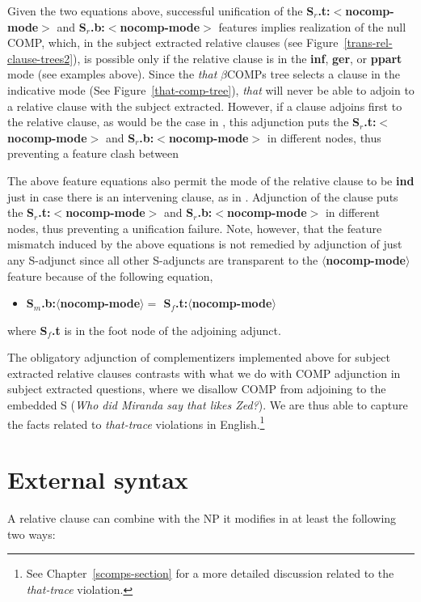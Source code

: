 Given the two equations above, successful unification of the {\bf
S$_r$.t:$<$nocomp-mode$>$} and {\bf S$_r$.b:$<$nocomp-mode$>$} features
implies realization of the null COMP, which, in the subject extracted
relative clauses (see Figure~\ref{trans-rel-clause-trees2}), is possible
only if the relative clause is in the {\bf inf}, {\bf ger}, or {\bf ppart}
mode (see examples above). Since the {\it that} $\beta$COMPs tree selects a
clause in the indicative mode (See Figure~\ref{that-comp-tree}), {\it that}
will never be able to adjoin to a relative clause with the subject
extracted. However, if a clause adjoins first to the relative clause, as
would be the case in , this adjunction puts the {\bf
S$_r$.t:$<$nocomp-mode$>$} and {\bf S$_r$.b:$<$nocomp-mode$>$} in different
nodes, thus preventing a feature clash between

The above feature equations also permit the mode of the relative clause to
be {\bf ind} just in case there is an intervening clause, as in
. Adjunction of the clause puts the {\bf S$_r$.t:$<$nocomp-mode$>$}
and {\bf S$_r$.b:$<$nocomp-mode$>$} in different nodes, thus preventing a
unification failure. Note, however, that the feature mismatch induced by
the above equations is not remedied by adjunction of just any S-adjunct
since all other S-adjuncts are transparent to the {\bf
$\langle$nocomp-mode$\rangle$} feature because of the following equation,

\begin{itemize}
\item {\bf S$_{m}$.b:$\langle$nocomp-mode$\rangle =$
S$_{f}$.t:$\langle$nocomp-mode$\rangle$}
\end{itemize}

where {\bf S$_{f}$.t} is in the foot node of the adjoining adjunct.


The obligatory adjunction of complementizers implemented above for subject
extracted relative clauses contrasts with what we do with COMP adjunction
in subject extracted questions, where we disallow COMP from adjoining to
the embedded S ({\it *Who did Miranda say that likes Zed?}). We are thus
able to capture the facts related to {\it that-trace} violations in
English.\footnote{%
%
See Chapter~\ref{scomps-section} for a more detailed discussion related to
the {\it that-trace} violation.%
%
}

\section{External syntax}
A relative clause can combine with the NP it modifies in at least 
the following two ways:


